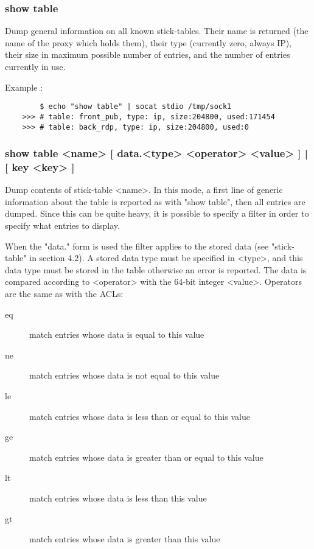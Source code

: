 \subsubsection[show table]{show table}
  Dump general information on all known stick-tables. Their name is returned
  (the name of the proxy which holds them), their type (currently zero, always
  IP), their size in maximum possible number of entries, and the number of
  entries currently in use.

  Example :
  \begin{verbatim}
        $ echo "show table" | socat stdio /tmp/sock1
    >>> # table: front_pub, type: ip, size:204800, used:171454
    >>> # table: back_rdp, type: ip, size:204800, used:0
  \end{verbatim}

\subsubsection[show table]{show table <name> [ data.<type> <operator> <value> ] | [ key <key> ]}
  Dump contents of stick-table <name>. In this mode, a first line of generic
  information about the table is reported as with "show table", then all
  entries are dumped. Since this can be quite heavy, it is possible to specify
  a filter in order to specify what entries to display.

  When the "data." form is used the filter applies to the stored data (see
  "stick-table" in section 4.2).  A stored data type must be specified
  in <type>, and this data type must be stored in the table otherwise an
  error is reported. The data is compared according to <operator> with the
  64-bit integer <value>.  Operators are the same as with the ACLs:

  \begin{description}
  \item[eq] match entries whose data is equal to this value
  \item[ne] match entries whose data is not equal to this value
  \item[le] match entries whose data is less than or equal to this value
  \item[ge] match entries whose data is greater than or equal to this value
  \item[lt] match entries whose data is less than this value
  \item[gt] match entries whose data is greater than this value
  \end{description}

